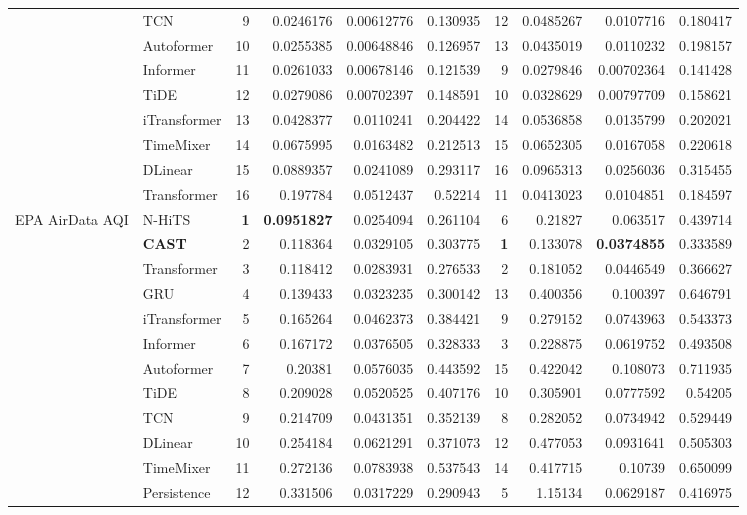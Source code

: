 \begin{longtable}{@{}llrrrrrrrr@{}}
 & TCN & 9 & 0.0246176 & 0.00612776 & 0.130935 & 12 & 0.0485267 & 0.0107716 & 0.180417 \\
 & Autoformer & 10 & 0.0255385 & 0.00648846 & 0.126957 & 13 & 0.0435019 & 0.0110232 & 0.198157 \\
 & Informer & 11 & 0.0261033 & 0.00678146 & 0.121539 & 9 & 0.0279846 & 0.00702364 & 0.141428 \\
 & TiDE & 12 & 0.0279086 & 0.00702397 & 0.148591 & 10 & 0.0328629 & 0.00797709 & 0.158621 \\
 & iTransformer & 13 & 0.0428377 & 0.0110241 & 0.204422 & 14 & 0.0536858 & 0.0135799 & 0.202021 \\
 & TimeMixer & 14 & 0.0675995 & 0.0163482 & 0.212513 & 15 & 0.0652305 & 0.0167058 & 0.220618 \\
 & DLinear & 15 & 0.0889357 & 0.0241089 & 0.293117 & 16 & 0.0965313 & 0.0256036 & 0.315455 \\
 & Transformer & 16 & 0.197784 & 0.0512437 & 0.52214 & 11 & 0.0413023 & 0.0104851 & 0.184597 \\
\addlinespace
EPA AirData AQI & N-HiTS & \textbf{1} & \textbf{0.0951827} & 0.0254094 & 0.261104 & 6 & 0.21827 & 0.063517 & 0.439714 \\
 & \textbf{CAST} & 2 & 0.118364 & 0.0329105 & 0.303775 & \textbf{1} & 0.133078 & \textbf{0.0374855} & 0.333589 \\
 & Transformer & 3 & 0.118412 & 0.0283931 & 0.276533 & 2 & 0.181052 & 0.0446549 & 0.366627 \\
 & GRU & 4 & 0.139433 & 0.0323235 & 0.300142 & 13 & 0.400356 & 0.100397 & 0.646791 \\
 & iTransformer & 5 & 0.165264 & 0.0462373 & 0.384421 & 9 & 0.279152 & 0.0743963 & 0.543373 \\
 & Informer & 6 & 0.167172 & 0.0376505 & 0.328333 & 3 & 0.228875 & 0.0619752 & 0.493508 \\
 & Autoformer & 7 & 0.20381 & 0.0576035 & 0.443592 & 15 & 0.422042 & 0.108073 & 0.711935 \\
 & TiDE & 8 & 0.209028 & 0.0520525 & 0.407176 & 10 & 0.305901 & 0.0777592 & 0.54205 \\
 & TCN & 9 & 0.214709 & 0.0431351 & 0.352139 & 8 & 0.282052 & 0.0734942 & 0.529449 \\
 & DLinear & 10 & 0.254184 & 0.0621291 & 0.371073 & 12 & 0.477053 & 0.0931641 & 0.505303 \\
 & TimeMixer & 11 & 0.272136 & 0.0783938 & 0.537543 & 14 & 0.417715 & 0.10739 & 0.650099 \\
 & Persistence & 12 & 0.331506 & 0.0317229 & 0.290943 & 5 & 1.15134 & 0.0629187 & 0.416975 \\

\end{longtable}
